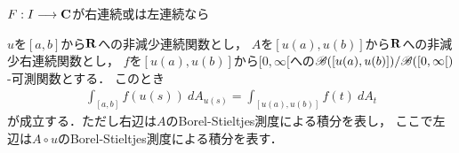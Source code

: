 	\begin{screen}
		\begin{thm}
			$F:I \longrightarrow \mathbf{C}$が右連続或は左連続なら
		\end{thm}
	\end{screen}
	
	\begin{screen}
		\begin{thm}[時間変更]
			$u$を$[a,b]$から$\mathbf{R}$への非減少連続関数とし，
			$A$を$[u(a),u(b)]$から$\mathbf{R}$への非減少右連続関数とし，
			$f$を$[u(a),u(b)]$から$[0,\infty[$への$\mathscr{B}([u(a),u(b)])/\mathscr{B}([0,\infty[)$-可測関数とする．
			このとき
			\begin{align}
				\int_{[a,b]} f(u(s))\ dA_{u(s)} = \int_{[u(a),u(b)]} f(t)\ dA_t
			\end{align}
			が成立する．ただし右辺は$A$のBorel-Stieltjes測度による積分を表し，
			ここで左辺は$A \circ u$のBorel-Stieltjes測度による積分を表す．
		\end{thm}
	\end{screen}
	

